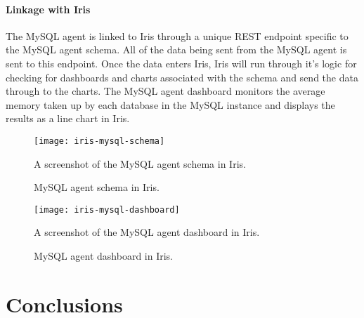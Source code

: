 \documentclass[12pt,a4paper,titlepage]{report}
\begin{document}
\subsubsection{Linkage with Iris}
The MySQL agent is linked to Iris through a unique REST endpoint specific to the MySQL agent schema. All of the data being sent from the MySQL agent is sent to this endpoint. Once the data enters Iris, Iris will run through it's logic for checking for dashboards and charts associated with the schema and send the data through to the charts. 
The MySQL agent dashboard monitors the average memory taken up by each database in the MySQL instance and displays the results as a line chart in Iris.
\begin{figure}[H]
\begin{tcolorbox}
\begin{center}
\texttt{[image: iris-mysql-schema]}
\end{center}
A screenshot of the MySQL agent schema in Iris.
\end{tcolorbox}
\caption{MySQL agent schema in Iris.}
\end{figure}

\begin{figure}[H]
\begin{tcolorbox}
\begin{center}
\texttt{[image: iris-mysql-dashboard]}
\end{center}
A screenshot of the MySQL agent dashboard in Iris.
\end{tcolorbox}
\caption{MySQL agent dashboard in Iris.}
\end{figure}

\chapter{Conclusions}


\nocite{*}
\printbibliography

\clearpage

\begin{appendices}

\end{appendices}
\end{document}
